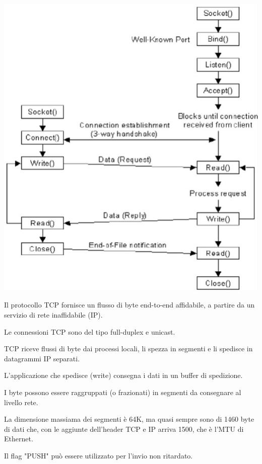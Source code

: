             \begin{center}
                \includegraphics[scale=0.4]{chapters/5/assets/schema_e.png}
            \end{center}

            Il protocollo TCP fornisce un flusso di byte end-to-end affidabile, a partire da un servizio di rete inaffidabile (IP).

            Le connessioni TCP sono del tipo full-duplex e unicast.

            TCP riceve flussi di byte dai processi locali, li spezza in segmenti e li spedisce in datagrammi IP separati.

            L'applicazione che spedisce (write) consegna i dati in un buffer di spedizione.

            I byte possono essere raggruppati (o frazionati) in segmenti da consegnare al livello rete.

            La dimensione massiama dei segmenti è 64K, ma quasi sempre sono di 1460 byte di dati che, con le aggiunte dell'header TCP e IP arriva 1500, che è l'MTU di Ethernet.

            Il flag "PUSH" può essere utilizzato per l'invio non ritardato.

